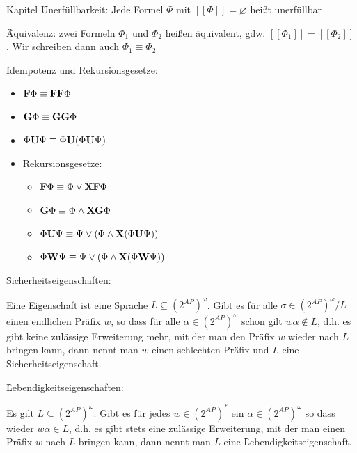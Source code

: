 \begin{chapter}{Kapitel}
\f{Unerfüllbarkeit}: Jede Formel $\Phi$ mit $[[\Phi]] = \varnothing$ heißt unerfüllbar
\vspace*{4pt}

\f{Äquivalenz}: zwei Formeln $\Phi_1$ und $\Phi_2$ heißen äquivalent, gdw. $[[\Phi_1]] = [[\Phi_2]]$. Wir schreiben dann auch $\Phi_1 \equiv \Phi_2$
\vspace*{6pt}

\f{Idempotenz und Rekursionsgesetze}:
\vspace*{5pt}

\begin{itemize}
 \item $\f{F}\Phi \equiv \f{FF}\Phi$
 \item $\f{G}\Phi \equiv \f{GG}\Phi$
 \item $\Phi\f{U}\Psi \equiv \Phi\f{U}(\Phi\f{U}\Psi)$
 \item Rekursionsgesetze:
 \begin{itemize}
  \item $\f{F}\Phi \equiv \Phi\vee\f{XF}\Phi$
  \item $\f{G}\Phi \equiv \Phi\wedge\f{XG}\Phi$
  \item $\Phi\f{U}\Psi \equiv \Psi\vee(\Phi\wedge\f{X}(\Phi\f{U}\Psi))$
  \item $\Phi\f{W}\Psi \equiv \Psi\vee(\Phi\wedge\f{X}(\Phi\f{W}\Psi))$
 \end{itemize}
\end{itemize}
\vspace*{5pt}

\f{Sicherheitseigenschaften}:
\vspace*{4pt}

\noindent Eine Eigenschaft ist eine Sprache $L \subseteq \left(2^{AP}\right)^\omega$. Gibt es für alle $\sigma \in \left(2^{AP}\right)^\omega/L$ einen endlichen Präfix $w$,
so dass für alle $\alpha \in \left(2^{AP}\right)^\omega$ schon gilt $w\alpha \notin L$, d.h. es gibt keine zulässige Erweiterung mehr, mit der man den Präfix $w$
wieder nach $L$ bringen kann, dann nennt man $w$ einen \f{schlechten Präfix} und $L$ eine \f{Sicherheitseigenschaft}.
\vspace*{6pt}

\f{Lebendigkeitseigenschaften}:
\vspace*{4pt}

\noindent Es gilt $L \subseteq \left(2^{AP}\right)^\omega$. Gibt es für jedes $w \in \left(2^{AP}\right)^*$ ein $\alpha \in \left(2^{AP}\right)^\omega$ so dass 
wieder $w\alpha \in L$, d.h. es gibt stets eine zulässige Erweiterung, mit der man einen Präfix $w$ nach $L$ bringen kann, dann nennt man $L$ eine 
\f{Lebendigkeitseigenschaft}.
\vspace*{5pt}


\end{chapter}
